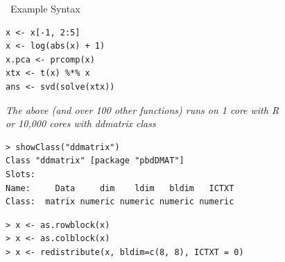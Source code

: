 \begin{frame}[fragile]
  \begin{block}{\pbdR\ Example Syntax}
\vspace{-2ex}
  \begin{lstlisting}
x <- x[-1, 2:5]
x <- log(abs(x) + 1)
x.pca <- prcomp(x)
xtx <- t(x) %*% x
ans <- svd(solve(xtx))
  \end{lstlisting}
\vspace{-1ex}
  \begin{center}
  \emph{The above (and over 100 other functions) runs on 1 core with R \\
    or 10,000 cores with \pbdR ddmatrix class}
  \end{center}
\vspace{-2ex}
\begin{lstlisting}
> showClass("ddmatrix")
Class "ddmatrix" [package "pbdDMAT"]
Slots:
Name:     Data     dim    ldim   bldim   ICTXT
Class:  matrix numeric numeric numeric numeric
\end{lstlisting}
\vspace{-2ex}
\begin{lstlisting}
> x <- as.rowblock(x)
> x <- as.colblock(x)
> x <- redistribute(x, bldim=c(8, 8), ICTXT = 0)
\end{lstlisting}
  \end{block}
\end{frame}


